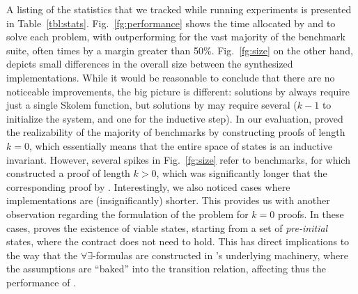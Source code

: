 A listing of the statistics that we tracked while running experiments is
presented in Table~\ref{tbl:stats}.
Fig.~\ref{fg:performance} shows the time allocated by \jsyn and \jsynvg to solve each problem, with \jsynvg
outperforming \jsyn for the vast majority of the benchmark suite, often times by a margin greater than
50\%. Fig.~\ref{fg:size} on the other hand, depicts small differences in the
overall size between the synthesized implementations. While it would be
reasonable to conclude that there are no noticeable improvements, the big picture is different:
solutions by \jsynvg always require just a single Skolem function, but solutions by \jsyn may require several ($k-1$ to initialize the system, and one for the inductive step).
In our evaluation, \jsyn proved the realizability of the majority of benchmarks by constructing proofs of length $k=0$, which essentially means that the entire space of states is an inductive invariant. 
However, several spikes in Fig.~\ref{fg:size} refer to benchmarks, for which \jsyn constructed a proof of length $k>0$, which was significantly longer that the corresponding proof by \jsynvg.
Interestingly, we also noticed cases where \jsyn
implementations are (insignificantly) shorter. This provides us with another 
observation regarding the formulation of the problem for $k=0$ proofs. In
these cases, \jsyn proves the existence of viable states, starting from a set
of \textit{pre-initial} states, where the contract does not need to hold. This
has direct implications to the way that the $\forall\exists$-formulas are
constructed in \jsyn's underlying machinery, where the assumptions are ``baked''
into the transition relation, affecting thus the performance of \aeval.


